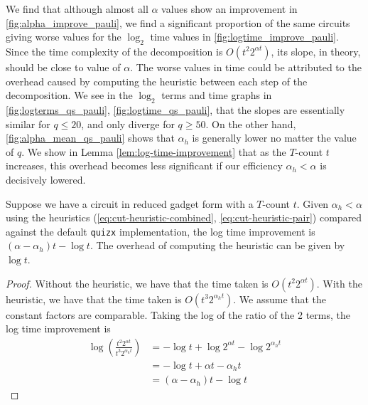 We find that although almost all $\alpha$ values show an improvement in \autoref{fig:alpha_improve_pauli},
we find a significant proportion of the same circuits giving worse values 
for the $\log_2$ time values in \autoref{fig:logtime_improve_pauli}.
Since the time complexity of the decomposition is $O(t^2 2^{\alpha t})$,
its slope, in theory, should be close to value of $\alpha$.
The worse values in time could be attributed to the overhead caused 
by computing the heuristic between each step of the decomposition.
We see in the $\log_2$ terms and time graphs in \autoref{fig:logterms_qs_pauli}, \ref{fig:logtime_qs_pauli}, 
that the slopes are essentially
similar for $q \leq 20$, and only diverge for $q \geq 50$.
On the other hand, \autoref{fig:alpha_mean_qs_pauli} shows that $\alpha_h$ is generally lower 
no matter the value of $q$.
We show in Lemma \ref{lem:log-time-improvement} that as the $T$-count $t$ increases, 
this overhead becomes less significant if our efficiency $\alpha_h < \alpha$ is decisively lowered.

\clearpage

\begin{lemma}
    \label{lem:log-time-improvement}
    Suppose we have a circuit in reduced gadget form with a $T$-count $t$.
    Given $\alpha_h < \alpha$ using the heuristics (\ref{eq:cut-heuristic-combined}, 
    \ref{eq:cut-heuristic-pair}) compared against the default \texttt{quizx} implementation,
    the log time improvement is $(\alpha - \alpha_h)t - \log t $.
    The overhead of computing the heuristic can be given by $\log t$.
\end{lemma}

\begin{proof}
    Without the heuristic, we have that the time taken is $O(t^2 2^{\alpha t})$.
    With the heuristic, we have that the time taken is $O(t^3 2^{\alpha_h t})$.
    We assume that the constant factors are comparable.
    Taking the log of the ratio of the 2 terms, the log time improvement is
\begin{equation}
\begin{aligned}
    \log\left(\frac{t^2 2^{\alpha t}}{t^3 2^{\alpha_h t}}\right)
    &= -\log t + \log 2^{\alpha t} - \log 2^{\alpha_h t}\\
    &= -\log t + \alpha t - \alpha_h t\\
    &= (\alpha - \alpha_h)t - \log t 
\end{aligned}
\end{equation}
\end{proof}

